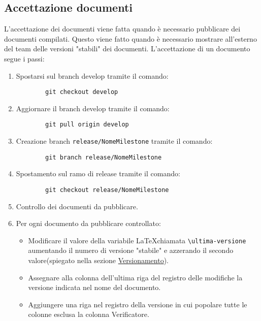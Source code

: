 \documentclass[a4paper, 12pt]{article}
\def\ultima-versione{ ULTIMA VERSIONE }
\begin{document}
\subsection{Accettazione documenti}
\label{subsec:acc}
L'accettazione dei documenti viene fatta quando è necessario pubblicare dei documenti compilati.
Questo viene fatto quando è necessario mostrare all'esterno del team delle versioni "stabili" dei documenti.
L'accettazione di un documento segue i passi:
\begin{enumerate}
    \item Spostarsi sul branch develop tramite il comando:
    \begin{lstlisting}
        git checkout develop
    \end{lstlisting}
     
    \item Aggiornare il branch develop tramite il comando: 
    \begin{lstlisting}
        git pull origin develop
    \end{lstlisting}
    
    \item Creazione branch \lstinline|release/NomeMilestone| tramite il comando:
    \begin{lstlisting}
        git branch release/NomeMilestone
    \end{lstlisting}

    \item Spostamento sul ramo di release tramite il comando:
    \begin{lstlisting}
        git checkout release/NomeMilestone
    \end{lstlisting}

    \item Controllo dei documenti da pubblicare.
    
    \item Per ogni documento da pubblicare controllato:
    \begin{itemize}
        \item Modificare il valore della variabile \LaTeX \space chiamata \lstinline|\ultima-versione| aumentando il numero di versione "stabile" e azzerando il secondo valore(spiegato nella sezione \hyperref[subsec:vers]{Versionamento}).

        \item Assegnare alla colonna dell'ultima riga del registro delle modifiche la versione indicata nel nome del documento.
        
        \item Aggiungere una riga nel registro della versione in cui popolare tutte le colonne esclusa la colonna Verificatore.  
        

\end{itemize}
\end{enumerate}
\end{document}
